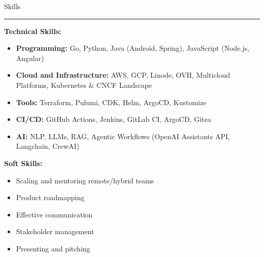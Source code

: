 \documentclass[10pt,a4paper]{article}
\newcommand{\CVSection}[1]{%
  \vspace{8pt}%
  {\headingfont\textcolor{techBlue}{#1}}\\
  \rule{\linewidth}{0.5pt}%
  \vspace{4pt}%
}
\begin{document}
\CVSection{Skills}
\textbf{Technical Skills:}
\begin{itemize}[leftmargin=*]
  \item \textbf{Programming:} Go, Python, Java (Android, Spring), JavaScript (Node.js, Angular)
  \item \textbf{Cloud and Infrastructure:} AWS, GCP, Linode, OVH, Multicloud Platforms, Kubernetes \& CNCF Landscape
  \item \textbf{Tools:} Terraform, Pulumi, CDK, Helm, ArgoCD, Kustomize
  \item \textbf{CI/CD:} GitHub Actions, Jenkins, GitLab CI, ArgoCD, Gitea
  \item \textbf{AI:} NLP, LLMs, RAG, Agentic Workflows (OpenAI Assistants API, Langchain, CrewAI)
\end{itemize}

\textbf{Soft Skills:}
\begin{itemize}[leftmargin=*]
  \item Scaling and mentoring remote/hybrid teams
  \item Product roadmapping
  \item Effective communication
  \item Stakeholder management
  \item Presenting and pitching
\end{itemize}

\end{document}
